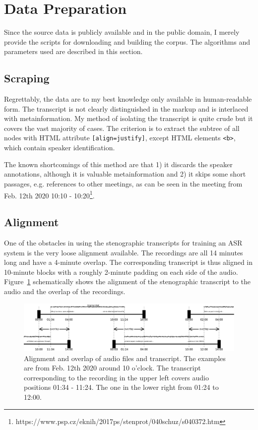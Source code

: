 \documentclass[runningheads,a4paper]{llncs}
\begin{document}
\section{Data Preparation}

Since the source data is publicly available and in the public domain, I merely
provide the scripts for downloading and building the corpus. The algorithms and
parameters used are described in this section.

\subsection{Scraping}

Regrettably, the data are to my best knowledge only available in human-readable
form. The transcript is not clearly distinguished in the markup and is
interlaced with metainformation. My method of isolating the transcript is quite
crude but it covers the vast majority of cases. The criterion is to extract the
subtree of all nodes with HTML attribute \texttt{[align=justify]}, except HTML
elements \texttt{<b>}, which contain speaker identification.

The known shortcomings of this method are that 1) it discards the speaker
annotations, although it is valuable metainformation and 2) it skips some short
passages, e.g. references to other meetings, as can be seen in the meeting
from Feb. 12th 2020 10:10 -
10:20\footnote{https://www.psp.cz/eknih/2017ps/stenprot/040schuz/s040372.htm}.

\subsection{Alignment}

One of the obstacles in using the stenographic transcripts for training an ASR
system is the very loose alignment available. The recordings are all 14 minutes
long and have a 4-minute overlap. The corresponding transcript is thus aligned
in 10-minute blocks with a roughly 2-minute padding on each side of the audio.
Figure~\ref{fig:overlap} schematically shows the alignment of the stenographic
transcript to the audio and the overlap of the recordings.

\begin{figure}[htpb]
\includegraphics[scale=0.25]{rc/overlap.eps}
\caption{Alignment and overlap of audio files and transcript. The examples are
from Feb. 12th 2020 around 10 o'clock. The transcript corresponding to the
recording in the upper left covers audio positions 01:34 - 11:24. The one in the
lower right from 01:24 to 12:00.}
\label{fig:overlap}
\end{figure}
\end{document}

